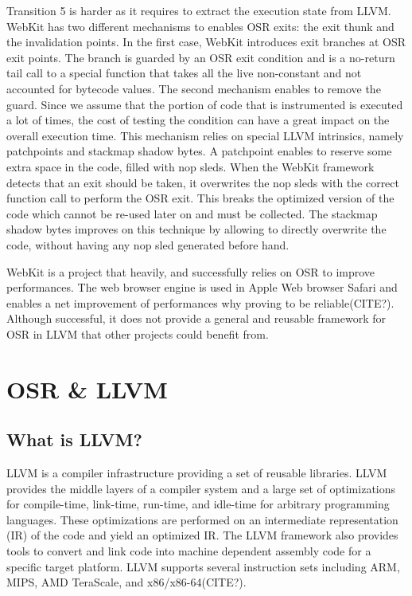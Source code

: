 Transition 5 is harder as it requires to extract the execution state from LLVM.
WebKit has two different mechanisms to enables OSR exits: the exit thunk and the invalidation points.
In the first case, WebKit introduces exit branches at OSR exit points.
The branch is guarded by an OSR exit condition and is a no-return tail call to a special function that takes all the live non-constant and not accounted for bytecode values.
The second mechanism enables to remove the guard.
Since we assume that the portion of code that is instrumented is executed a lot of times, the cost of testing the condition can have a great impact on the overall execution time.
This mechanism relies on special LLVM intrinsics, namely patchpoints and stackmap shadow bytes.
A patchpoint enables to reserve some extra space in the code, filled with nop sleds. 
When the WebKit framework detects that an exit should be taken, it overwrites the nop sleds with the correct function call to perform the OSR exit.
This breaks the optimized version of the code which cannot be re-used later on and must be collected.
The stackmap shadow bytes improves on this technique by allowing to directly overwrite the code, without having any nop sled generated before hand.

WebKit is a project that heavily, and successfully relies on OSR to improve performances.
The web browser engine is used in Apple Web browser Safari and enables a net improvement of performances why proving to be reliable(CITE?).
Although successful, it does not provide a general and reusable framework for OSR in LLVM that other projects could benefit from.\\

\section{OSR \& LLVM}\label{OSR&VM}
\subsection{What is LLVM?}
LLVM is a compiler infrastructure providing a set of reusable libraries.
LLVM provides the middle layers of a compiler system and a large set of optimizations for compile-time, link-time, run-time, and idle-time for arbitrary programming languages.
These optimizations are performed on an intermediate representation (IR) of the code and yield an optimized IR.
The LLVM framework also provides tools to convert and link code into machine dependent assembly code for a specific target platform.
LLVM supports several instruction sets including ARM, MIPS, AMD TeraScale, and x86/x86-64(CITE?).\\

